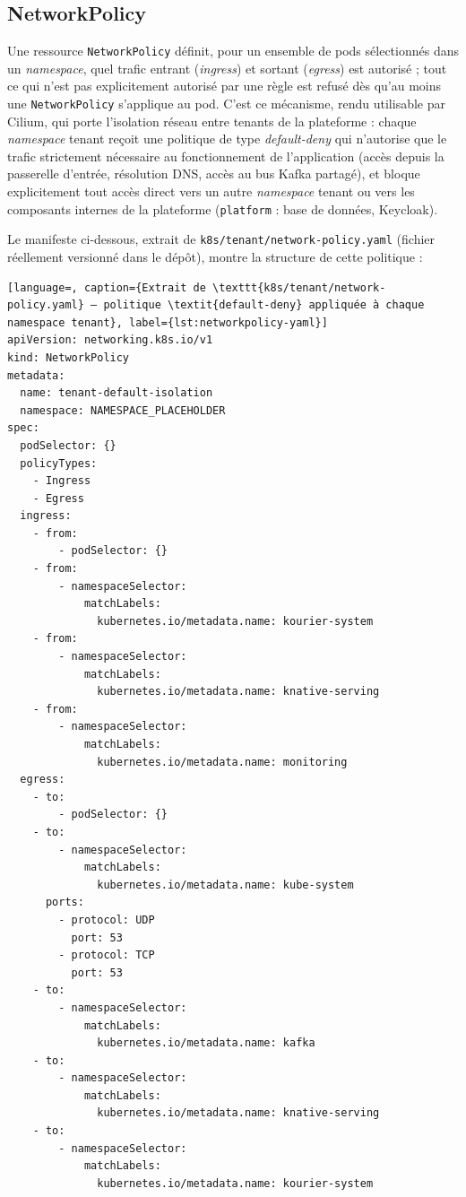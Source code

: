 \subsection{NetworkPolicy}

Une ressource \texttt{NetworkPolicy} définit, pour un ensemble de pods sélectionnés dans un \textit{namespace}, quel trafic entrant (\textit{ingress}) et sortant (\textit{egress}) est autorisé ; tout ce qui n'est pas explicitement autorisé par une règle est refusé dès qu'au moins une \texttt{NetworkPolicy} s'applique au pod. C'est ce mécanisme, rendu utilisable par Cilium, qui porte l'isolation réseau entre tenants de la plateforme : chaque \textit{namespace} tenant reçoit une politique de type \textit{default-deny} qui n'autorise que le trafic strictement nécessaire au fonctionnement de l'application (accès depuis la passerelle d'entrée, résolution DNS, accès au bus Kafka partagé), et bloque explicitement tout accès direct vers un autre \textit{namespace} tenant ou vers les composants internes de la plateforme (\texttt{platform} : base de données, Keycloak).

Le manifeste ci-dessous, extrait de \texttt{k8s/tenant/network-policy.yaml} (fichier réellement versionné dans le dépôt), montre la structure de cette politique :

\begin{lstlisting}[language=, caption={Extrait de \texttt{k8s/tenant/network-policy.yaml} — politique \textit{default-deny} appliquée à chaque namespace tenant}, label={lst:networkpolicy-yaml}]
apiVersion: networking.k8s.io/v1
kind: NetworkPolicy
metadata:
  name: tenant-default-isolation
  namespace: NAMESPACE_PLACEHOLDER
spec:
  podSelector: {}
  policyTypes:
    - Ingress
    - Egress
  ingress:
    - from:
        - podSelector: {}
    - from:
        - namespaceSelector:
            matchLabels:
              kubernetes.io/metadata.name: kourier-system
    - from:
        - namespaceSelector:
            matchLabels:
              kubernetes.io/metadata.name: knative-serving
    - from:
        - namespaceSelector:
            matchLabels:
              kubernetes.io/metadata.name: monitoring
  egress:
    - to:
        - podSelector: {}
    - to:
        - namespaceSelector:
            matchLabels:
              kubernetes.io/metadata.name: kube-system
      ports:
        - protocol: UDP
          port: 53
        - protocol: TCP
          port: 53
    - to:
        - namespaceSelector:
            matchLabels:
              kubernetes.io/metadata.name: kafka
    - to:
        - namespaceSelector:
            matchLabels:
              kubernetes.io/metadata.name: knative-serving
    - to:
        - namespaceSelector:
            matchLabels:
              kubernetes.io/metadata.name: kourier-system
\end{lstlisting}

